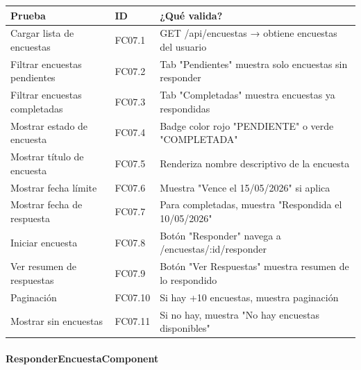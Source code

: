 \begin{table}[H]
\centering
\begin{tabular}{|l|l|p{6cm}|}
\hline
\textbf{Prueba} & \textbf{ID} & \textbf{¿Qué valida?} \\ \hline
Cargar lista de encuestas & FC07.1 & GET /api/encuestas → obtiene encuestas del usuario \\ \hline
Filtrar encuestas pendientes & FC07.2 & Tab "Pendientes" muestra solo encuestas sin responder \\ \hline
Filtrar encuestas completadas & FC07.3 & Tab "Completadas" muestra encuestas ya respondidas \\ \hline
Mostrar estado de encuesta & FC07.4 & Badge color rojo "PENDIENTE" o verde "COMPLETADA" \\ \hline
Mostrar título de encuesta & FC07.5 & Renderiza nombre descriptivo de la encuesta \\ \hline
Mostrar fecha límite & FC07.6 & Muestra "Vence el 15/05/2026" si aplica \\ \hline
Mostrar fecha de respuesta & FC07.7 & Para completadas, muestra "Respondida el 10/05/2026" \\ \hline
Iniciar encuesta & FC07.8 & Botón "Responder" navega a /encuestas/:id/responder \\ \hline
Ver resumen de respuestas & FC07.9 & Botón "Ver Respuestas" muestra resumen de lo respondido \\ \hline
Paginación & FC07.10 & Si hay +10 encuestas, muestra paginación \\ \hline
Mostrar sin encuestas & FC07.11 & Si no hay, muestra "No hay encuestas disponibles" \\ \hline
\end{tabular}
\end{table}

\paragraph{ResponderEncuestaComponent}

